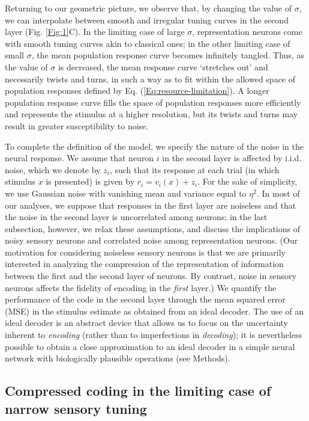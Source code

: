 \documentclass[a4paper]{article}%
\begin{document}
Returning to our geometric picture, we observe that, by changing the value of
$\sigma$, we can interpolate between smooth and irregular tuning curves in the
second layer (Fig. \ref{Fig:1}C). In the limiting case of large $\sigma$,
representation neurons come with smooth tuning curves akin to classical ones;
in the other limiting case of small $\sigma$, the mean population response
curve becomes infinitely tangled. Thus, as the value of $\sigma$ is decreased,
the mean response curve `stretches out' and necessarily twists and turns, in
such a way as to fit within the allowed space of population responses defined
by Eq. (\ref{Eq:resource-limitation}). A longer population response curve
fills the space of population responses more efficiently and represents the
stimulus at a higher resolution, but its twists and turns may result in
greater susceptibility to noise.

To complete the definition of the model, we specify the nature of the noise in
the neural response. We assume that neuron $i$ in the second layer is affected
by i.i.d. noise, which we denote by $z_{i}$, such that its response at each
trial (in which stimulus $x$ is presented) is given by $r_{i}=v_{i}\left(
x\right)  +z_{i}$. For the sake of simplicity, we use Gaussian noise with
vanishing mean and variance equal to $\eta^{2}$. In most of our analyses, we
suppose that responses in the first layer are noiseless and that the noise in
the second layer is uncorrelated among neurons; in the last subsection,
however, we relax these assumptions, and discuss the implications of noisy
sensory neurons and correlated noise among representation neurons. (Our
motivation for considering noiseless sensory neurons is that we are primarily
interested in analyzing the compression of the representation of information
between the first and the second layer of neurons. By contrast, noise in
sensory neurons affects the fidelity of encoding in the \textit{first} layer.)
We quantify the performance of the code in the second layer through the mean
squared error (MSE) in the stimulus estimate as obtained from an ideal
decoder. The use of an ideal decoder is an abstract device that allows us to
focus on the uncertainty inherent to \textit{encoding} (rather than to
imperfections in \textit{decoding}); it is nevertheless possible to obtain a
close approximation to an ideal decoder in a simple neural network with
biologically plausible operations (see Methods).

\subsection*{Compressed coding in the limiting case of narrow sensory tuning}
\end{document}
